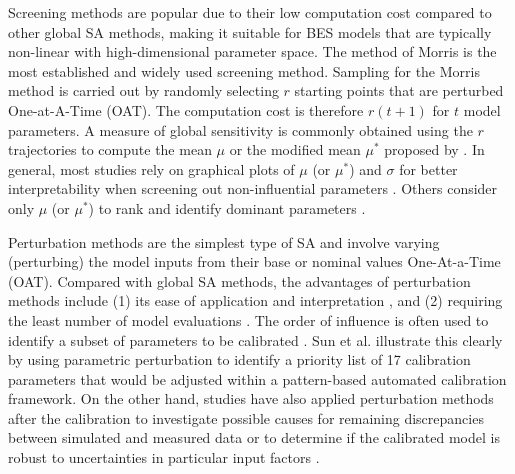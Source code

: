\documentclass[review]{elsarticle}
\begin{document}
Screening methods are popular due to their low computation cost compared to other global SA methods, making it suitable for BES models that are typically non-linear with high-dimensional parameter space. The method of Morris \cite{morris1991factorial} is the most established and widely used screening method. Sampling for the Morris method is carried out by randomly selecting $r$ starting points that are perturbed One-at-A-Time (OAT). The computation cost is therefore $r(t+1)$ for $t$ model parameters. A measure of global sensitivity is commonly obtained using the $r$ trajectories to compute the mean $\mu$ \cite{morris1991factorial} or the modified mean $\mu^*$ proposed by \cite{campolongo2007effective}. In general, most studies rely on graphical plots of $\mu$ (or $\mu^*$) and $\sigma$ for better interpretability when screening out non-influential parameters \cite{martinez2019energy, kristensen2018hierarchical, chong2017bayesian, chong2018guidelines, chong2019continuous,li2018stepwise, kim2016development, ramosruiz2016genetic, yang2015model, zuhaib2019application, larochellemartin2019energy, martinez2020model, ferrara2020optimizing}. Others consider only $\mu$ (or $\mu^*$) to rank and identify dominant parameters \cite{heo2015evaluation, chen2019district, wang2020bayesian, zhang2020development, giuliani2016modeling, roberti2015calibrating}.

Perturbation methods are the simplest type of SA and involve varying (perturbing) the model inputs from their base or nominal values One-At-a-Time (OAT). Compared with global SA methods, the advantages of perturbation methods include (1) its ease of application and interpretation \cite{tian2013review}, and (2) requiring the least number of model evaluations \cite{pianosi2016sensitivity}. The order of influence is often used to identify a subset of parameters to be calibrated \cite{robertson2015reduced, sun2016pattern, enriquez2017towards, tuysuz2020calibrating, kim2015development, kim2016development, elharidi2017energy, glasgo2017assessing}. Sun et al. \cite{sun2016pattern} illustrate this clearly by using parametric perturbation to identify a priority list of 17 calibration parameters that would be adjusted within a pattern-based automated calibration framework. On the other hand, studies have also applied perturbation methods after the calibration to investigate possible causes for remaining discrepancies between simulated and measured data \cite{allard2018energy} or to determine if the calibrated model is robust to uncertainties in particular input factors \cite{mihai2017bottom}. 
\end{document}
